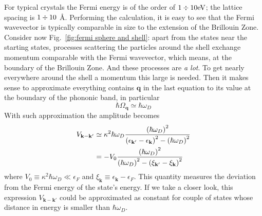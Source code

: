 For typical crystals the Fermi energy is of the order of $1 \divisionsymbol 10 \mathrm{eV}$; the lattice spacing is $1 \divisionsymbol 10$ \r{A}. Performing the calculation, it is easy to see that the Fermi wavevector is typically comparable in size to the extension of the Brillouin Zone. Consider now Fig.~\ref{fig:fermi sphere and shell}: apart from the states near the starting states, processes scattering the particles around the shell exchange momentum comparable with the Fermi wavevector, which means, at the boundary of the Brillouin Zone. And these processes are \textit{a lot}. To get nearly everywhere around the shell a momentum this large is needed. Then it makes sense to approximate everything contains $\mathbf{q}$ in the last equation to its value at the boundary of the phononic band, in particular
\[
	\hbar\Omega_\mathbf{q} \simeq \hbar\omega_D
\]
With such approximation the amplitude becomes
\[
\begin{aligned}
	V_{\mathbf{k}-\mathbf{k}'} &\simeq \kappa^2 \hbar\omega_D \frac{
		\left({\hbar\omega_D}\right)^2
	}{
		\left({\epsilon_{\mathbf{k}'} - \epsilon_\mathbf{k}}\right)^2 - \left({\hbar\omega_D}\right)^2
	} \\
	&= - V_0 \frac{
		\left({\hbar\omega_D}\right)^2
	}{
		\left({\hbar\omega_D}\right)^2 - \left({\xi_{\mathbf{k}'} - \xi_\mathbf{k}}\right)^2
	}
\end{aligned}
\]
where $V_0 \equiv \kappa^2 \hbar\omega_D \ll \epsilon_F$ and $\xi_\mathbf{k} \equiv \epsilon_\mathbf{k} - \epsilon_F$. This quantity measures the deviation from the Fermi energy of the state's energy. If we take a closer look, this expression $V_{\mathbf{k}-\mathbf{k}'}$ could be approximated as constant for couple of states whose distance in energy is smaller than $\hbar\omega_D$.

